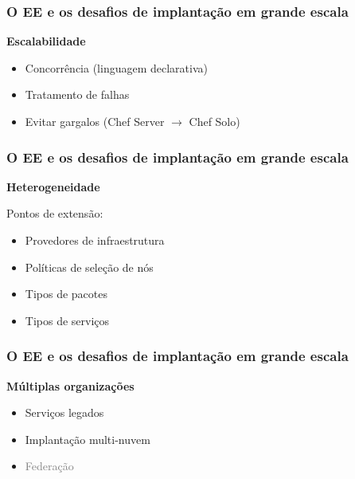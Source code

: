 \documentclass{beamer}
\newcommand\subtitulo[1]{{\large \textbf{#1}}}
\begin{document}

\begin{frame}
\frametitle{O EE e os desafios de implantação em grande escala}

\subtitulo{Escalabilidade}

\vspace{1cm}

\begin{itemize}
\item Concorrência (linguagem declarativa)
\item Tratamento de falhas
\item Evitar gargalos (Chef Server $\rightarrow$ Chef Solo)
\end{itemize}

\end{frame}



\begin{frame}
\frametitle{O EE e os desafios de implantação em grande escala}

\subtitulo{Heterogeneidade}

\vspace{1cm}

Pontos de extensão:

\begin{itemize}
\item Provedores de infraestrutura
\item Políticas de seleção de nós
\item Tipos de pacotes
\item Tipos de serviços
\end{itemize}

\end{frame}



\begin{frame}
\frametitle{O EE e os desafios de implantação em grande escala}

\subtitulo{Múltiplas organizações}

\vspace{1cm}

\begin{itemize}
\item Serviços legados
\item Implantação multi-nuvem
\item \textcolor{gray}{Federação}
\end{itemize}

\end{frame}
\end{document}

